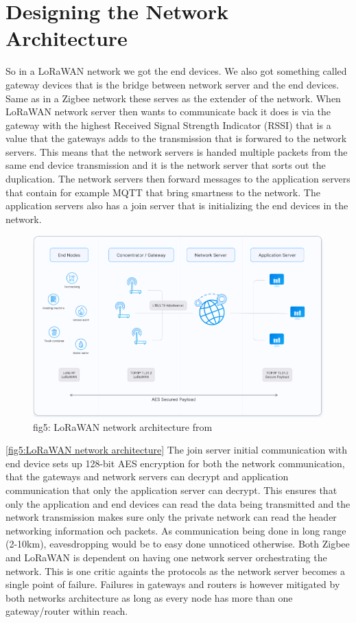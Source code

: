 \documentclass[article,a4paper]{IEEEtran}
\begin{document}
    \section{Designing the Network Architecture}
    So in a LoRaWAN network we got the end devices. We also got something called gateway devices that is the bridge between network server and the end devices. Same as in a Zigbee network these serves as the extender of the network. When LoRaWAN network server then wants to communicate back it does is via the gateway with the highest Received Signal Strength Indicator (RSSI) that is a value that the gateways adds to the transmission that is forwared to the network servers. This means that the network servers is handed multiple packets from the same end device transmission and it is the network server that sorts out the duplication. The network servers then forward messages to the application servers that contain for example MQTT that bring smartness to the network. The application servers also has a join server that is initializing the end devices in the network. 
    \begin{figure}
        \includegraphics[width=\columnwidth]{LoRaWANnetwork.png} 
        \caption{ fig5: LoRaWAN network architecture from \cite{LoRaWANarchi} }
        \label{fig5:LoRaWAN network architecture }   
    \end{figure}
    \ref{fig5:LoRaWAN network architecture} 
    The join server initial communication with end device sets up 128-bit AES encryption for both the network communication, that the gateways and network servers can decrypt and application communication that only the application server can decrypt. This ensures that only the application and end devices can read the data being transmitted and the network transmission makes sure only the private network can read the header networking information och packets. As communication being done in long range (2-10km), eavesdropping would be to easy done unnoticed otherwise. 
    \newline\newline
    Both Zigbee and LoRaWAN is dependent on having one network server orchestrating the network. This is one critic againts the protocols as the network server becomes a single point of failure. Failures in gateways and routers is however mitigated by both networks architecture as long as every node has more than one gateway/router within reach.    
\end{document}
